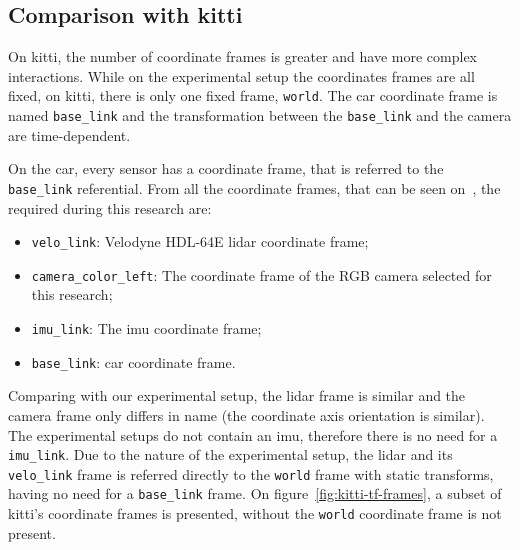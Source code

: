 \subsection{Comparison with \ac{kitti}}
\label{subsec:calibration:kitii-comparision}

On \ac{kitti}, the number of coordinate frames is greater and have more complex interactions. While on the experimental setup the coordinates frames are all fixed, on \ac{kitti}, there is only one fixed frame, \texttt{world}. The car coordinate frame is named \texttt{base\_link} and the transformation between the \texttt{base\_link} and the camera are time-dependent.

On the car, every sensor has a coordinate frame, that is referred to the \texttt{base\_link} referential. From all the coordinate frames, that can be seen on~\cite{Geiger2013a}, the required during this research are:

\begin{itemize}
	\item \texttt{velo\_link}: Velodyne HDL-64E \ac{lidar} coordinate frame;
	\item \texttt{camera\_color\_left}: The coordinate frame of the RGB camera selected for this research;
	\item \texttt{imu\_link}: The \ac{imu} coordinate frame;
	\item \texttt{base\_link}: car coordinate frame.
\end{itemize}

Comparing with our experimental setup, the \ac{lidar} frame is similar and the camera frame only differs in name (the coordinate axis orientation is similar). The experimental setups do not contain an \ac{imu}, therefore there is no need for a \texttt{imu\_link}. Due to the nature of the experimental setup, the \ac{lidar} and its \texttt{velo\_link} frame is referred directly to the \texttt{world} frame with static transforms, having no need for a \texttt{base\_link} frame. On figure~\ref{fig:kitti-tf-frames}, a subset of \ac{kitti}'s coordinate frames is presented, without the \texttt{world} coordinate frame is not present. 


